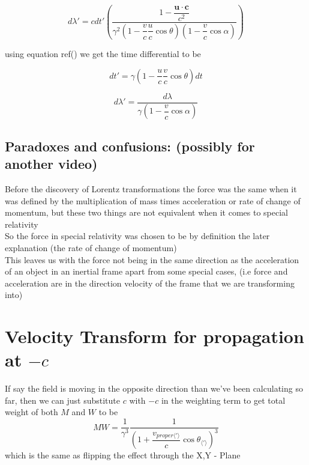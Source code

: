 \begin{equation}
	d\lambda' = c dt' \left( \dfrac{  1 - \dfrac{\mathbf{u}\cdot\mathbf{c}}{c^2}  }
	{ \gamma^2 \left(1-\dfrac{v}{c}\dfrac{u}{c}\cos\theta \right) \left(1-\dfrac{v}{c}\cos\alpha \right)} \right)
\end{equation}

using equation ref() we get the time differential to be

\begin{equation}
	dt' = \gamma \left( 1 - \dfrac{u}{c}\dfrac{v}{c}\cos\theta \right) dt
\end{equation}

\begin{equation}
	d\lambda' = \dfrac{ d\lambda }{ \gamma \left(1-\dfrac{v}{c}\cos\alpha \right)}
\end{equation}


\section{Paradoxes and confusions: (possibly for another video)}

Before the discovery of Lorentz transformations the force was the same when it was defined by the multiplication of mass times acceleration or rate of change of momentum, but these two things are not equivalent when it comes to special relativity\\
So the force in special relativity was chosen to be by definition the later explanation (the rate of change of momentum)\\
This leaves us with the force not being in the same direction as the acceleration of an object in an inertial frame apart from some special cases, (i.e force and acceleration are in the direction velocity of the frame that we are transforming into)

\chapter{Velocity Transform for propagation at \texorpdfstring{$-c$}{TEXT}}

If say the field is moving in the opposite direction than we've been calculating so far, then we can just substitute $c$ with $-c$ in the weighting term to get total weight of both $M$ and $W$ to be
\begin{equation}%
    M W = \dfrac{1}{\gamma^3}\dfrac{1}{\left( 1 + \dfrac{v_{proper\langle ' \rangle}}{c}\cos{\theta_{\langle ' \rangle}} \right)^3}
\end{equation}%
which is the same as flipping the effect through the X,Y - Plane

